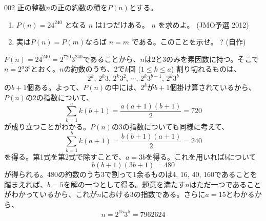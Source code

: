 \begin{prob}{002}{}{}
 正の整数$n$の正の約数の積を$P(n)$とする。
 \begin{enumerate}
  \item $P(n)=24^{240}$ となる $n$ は1つだけある。 $n$ を求めよ。  (JMO予選 2012)
  \item 実は$P(n)=P(m)$ならば $n=m$ である。このことを示せ。 \hosi ? (自作)
 \end{enumerate}
\end{prob}
$P(n)=24^{240}=2^{720} 3^{240}$であることから、$n$は2と3のみを素因数に持つ。そこで$n=2^a 3^b$とおく。$n$の約数のうち、2で$k$回 ($1\le k\le a$) 割り切れるものは、
\[ 2^k,\, 2^k 3,\, 2^k 3^2,\, \cdots,\, 2^k 3^{b-1},\, 2^k 3^b \]
の$b+1$個ある。よって、$P(n)$の中には、$2^k$が$b+1$個掛け算されているから、$P(n)$の2の指数について、
\[ \sum_{k=1}^a k(b+1) = \frac{a(a+1)(b+1)}{2} = 720 \]
が成り立つことがわかる。$P(n)$の3の指数についても同様に考えて、
\[ \sum_{k=1}^b k(a+1) = \frac{b(b+1)(a+1)}{2} = 240 \]
を得る。第1式を第2式で除すことで、$a=3b$を得る。これを用いれば$b$について
\[ b(b+1)(3b+1)=480 \]
が得られる。480の約数のうち3で割って1余るものは4, 16, 40, 160であることを踏まえれば、$b=5$を解の一つとして得る。題意を満たす$n$はただ一つであることがわかっているから、これが$n$における3の指数である。さらに$a=15$とわかるから、
\[ n=2^{15} 3^5=7962624 \]

